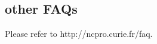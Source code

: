 \documentclass[12pt]{article}
\begin{document}
\subsection{other FAQs}
 
Please refer to http://ncpro.curie.fr/faq.




\nocite{*}
\end{document}
